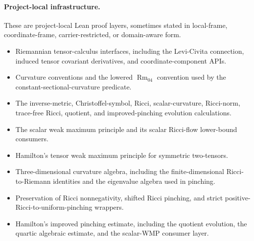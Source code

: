 \documentclass[11pt]{article}
\theoremstyle{plain}
\theoremstyle{definition}
\theoremstyle{remark}
\newcommand{\Rm}{\operatorname{Rm}}
\begin{document}
\paragraph{Project-local infrastructure.}
These are project-local Lean proof layers, sometimes stated in local-frame,
coordinate-frame, carrier-restricted, or domain-aware form.
\begin{itemize}[leftmargin=2em]
  \item Riemannian tensor-calculus interfaces, including the Levi-Civita
  connection, induced tensor covariant derivatives, and coordinate-component
  APIs.
  \item Curvature conventions and the lowered \(\Rm_{04}\) convention used by
  the constant-sectional-curvature predicate.
  \item The inverse-metric, Christoffel-symbol, Ricci, scalar-curvature,
  Ricci-norm, trace-free Ricci, quotient, and improved-pinching evolution
  calculations.
  \item The scalar weak maximum principle and its scalar Ricci-flow lower-bound
  consumers.
  \item Hamilton's tensor weak maximum principle for symmetric two-tensors.
  \item Three-dimensional curvature algebra, including the finite-dimensional
  Ricci-to-Riemann identities and the eigenvalue algebra used in pinching.
  \item Preservation of Ricci nonnegativity, shifted Ricci pinching, and strict
  positive-Ricci-to-uniform-pinching wrappers.
  \item Hamilton's improved pinching estimate, including the quotient
  evolution, the quartic algebraic estimate, and the scalar-WMP consumer layer.
\end{itemize}
\end{document}
